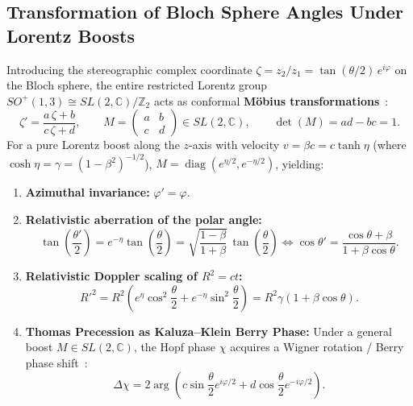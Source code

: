 \documentclass[11pt,a4paper]{article}
\begin{document}
\subsection{Transformation of Bloch Sphere Angles Under Lorentz Boosts}
Introducing the stereographic complex coordinate $\zeta = z_2 / z_1 = \tan(\theta/2)\, e^{i\varphi}$ on the Bloch sphere, the entire restricted Lorentz group $SO^+(1,3) \cong SL(2,\mathbb{C})/\mathbb{Z}_2$ acts as conformal \textbf{M\"obius transformations}~\cite{PenroseRindler1984}:
\begin{equation}
\zeta' = \frac{a\,\zeta + b}{c\,\zeta + d}, \qquad M = \begin{pmatrix} a & b \\ c & d \end{pmatrix} \in SL(2,\mathbb{C}), \qquad \det(M) = ad - bc = 1.
\end{equation}
For a pure Lorentz boost along the $z$-axis with velocity $v = \beta c = c\tanh\eta$ (where $\cosh\eta = \gamma = (1 - \beta^2)^{-1/2}$), $M = \operatorname{diag}(e^{\eta/2}, e^{-\eta/2})$, yielding:
\begin{enumerate}
    \item \textbf{Azimuthal invariance:} $\varphi' = \varphi$.
    \item \textbf{Relativistic aberration of the polar angle:}
    \begin{equation}
    \tan\left(\frac{\theta'}{2}\right) = e^{-\eta} \tan\left(\frac{\theta}{2}\right) = \sqrt{\frac{1 - \beta}{1 + \beta}}\, \tan\left(\frac{\theta}{2}\right) \iff \cos\theta' = \frac{\cos\theta + \beta}{1 + \beta\cos\theta}.
    \end{equation}
    \item \textbf{Relativistic Doppler scaling of $R^2 = ct$:}
    \begin{equation}
    R'^2 = R^2 \left( e^\eta \cos^2\frac{\theta}{2} + e^{-\eta} \sin^2\frac{\theta}{2} \right) = R^2 \gamma (1 + \beta\cos\theta).
    \end{equation}
    \item \textbf{Thomas Precession as Kaluza--Klein Berry Phase:} Under a general boost $M \in SL(2,\mathbb{C})$, the Hopf phase $\chi$ acquires a Wigner rotation / Berry phase shift~\cite{Berry1984,Thomas1926}:
    \begin{equation}
    \Delta\chi = 2\arg\left( c \sin\frac{\theta}{2} e^{i\varphi/2} + d \cos\frac{\theta}{2} e^{-i\varphi/2} \right).
    \end{equation}
\end{enumerate}
\end{document}
